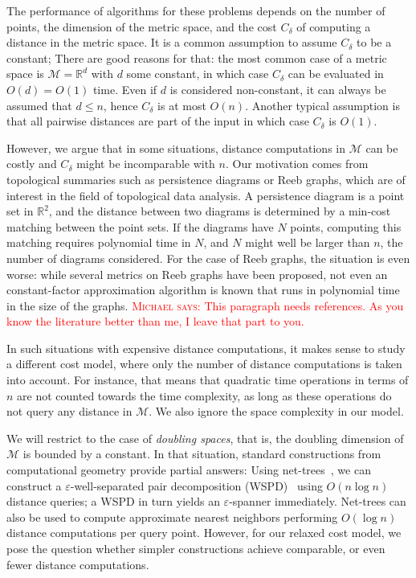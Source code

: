 \documentclass[a4paper,USenglish]{socg-lipics-v2018}
\newcommand{\R}{\mathbb{R}}
\newcommand{\eps}{\varepsilon}
\newcommand{\metricspace}{\mathcal{M}}
\newcommand{\dist}{\delta}
\newcommand{\complexity}{C_{\dist}}
\def\marrow{\marginpar[\hfill$\longrightarrow$]{$\longleftarrow$}}
\def\michael#1{\textcolor{red}{\textsc{Michael says: }{\marrow\sf #1}}}
\begin{document}
The performance of algorithms for these problems depends on the number of points,
the dimension of the metric space, and the cost $\complexity$ of computing a distance in the metric space.
It is a common assumption to assume $\complexity$ to be a constant; 
There are good reasons for that: the most common case of a metric space
is $\metricspace=\R^d$ with $d$ some constant, in which case $\complexity$ can be evaluated in $O(d)=O(1)$ time.
Even if $d$ is considered non-constant,
it can always be assumed that $d\leq n$, hence $\complexity$ is at most $O(n)$.
Another typical assumption is that all pairwise distances are part of the input
in which case $\complexity$ is $O(1)$.

However, we argue that in some situations, distance computations
in $\metricspace$ can be costly and $\complexity$ might be incomparable
with $n$. Our motivation comes from topological summaries
such as persistence diagrams or Reeb graphs, which are of interest
in the field of topological data analysis. A persistence diagram
is a point set in $\R^2$, and the distance between two diagrams
is determined by a min-cost matching between the point sets.
If the diagrams have $N$ points, computing this matching requires
polynomial time in $N$, and $N$ might well be larger than $n$, the number
of diagrams considered. For the case of Reeb graphs, the situation is even
worse: while several metrics on Reeb graphs have been proposed,
not even an constant-factor approximation algorithm is known that runs
in polynomial time in the size of the graphs.
\michael{This paragraph needs references. As you know the literature better than me,
I leave that part to you.}

In such situations with expensive distance computations, 
it makes sense to study a different cost model, where only the number of distance computations
is taken into account. For instance, that means that quadratic time operations in terms of $n$
are not counted towards the time complexity, as long as these operations do not query any distance
in $\metricspace$. We also ignore the space complexity in our model.

We will restrict to the case of \emph{doubling spaces}, that is, the doubling dimension
of $\metricspace$ is bounded by a constant. 
In that situation, standard constructions from computational geometry provide partial answers:
Using net-trees~\cite{hm-fast}, we can construct a $\eps$-well-separated pair decomposition (WSPD)~\cite{CK-decomposition} using $O(n\log n)$ distance queries; a WSPD in turn yields
an $\eps$-spanner immediately. Net-trees can also be used to compute approximate nearest neighbors
performing $O(\log n)$ distance computations per query point.
However, for our relaxed cost model, we pose the question whether simpler constructions achieve
comparable, or even fewer distance computations.
\end{document}
